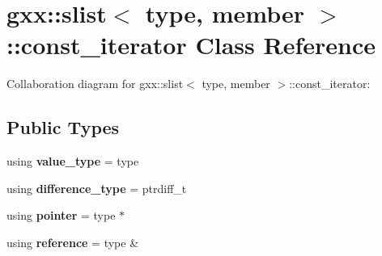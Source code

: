 \hypertarget{classgxx_1_1slist_1_1const__iterator}{}\section{gxx\+:\+:slist$<$ type, member $>$\+:\+:const\+\_\+iterator Class Reference}
\label{classgxx_1_1slist_1_1const__iterator}


Collaboration diagram for gxx\+:\+:slist$<$ type, member $>$\+:\+:const\+\_\+iterator\+:
\subsection*{Public Types}
\begin{DoxyCompactItemize}
\item 
using {\bfseries value\+\_\+type} = type\hypertarget{classgxx_1_1slist_1_1const__iterator_a61d5f20481475a45a99c2936e573c445}{}\label{classgxx_1_1slist_1_1const__iterator_a61d5f20481475a45a99c2936e573c445}

\item 
using {\bfseries difference\+\_\+type} = ptrdiff\+\_\+t\hypertarget{classgxx_1_1slist_1_1const__iterator_ac519aa98365df7f3db71f9bd1b4997b1}{}\label{classgxx_1_1slist_1_1const__iterator_ac519aa98365df7f3db71f9bd1b4997b1}

\item 
using {\bfseries pointer} = type $\ast$\hypertarget{classgxx_1_1slist_1_1const__iterator_a3a134bb519f5a5bec184e701dbf1a7a6}{}\label{classgxx_1_1slist_1_1const__iterator_a3a134bb519f5a5bec184e701dbf1a7a6}

\item 
using {\bfseries reference} = type \&\hypertarget{classgxx_1_1slist_1_1const__iterator_a148e080572b609687c5cf215152165a4}{}\label{classgxx_1_1slist_1_1const__iterator_a148e080572b609687c5cf215152165a4}

\end{DoxyCompactItemize}
